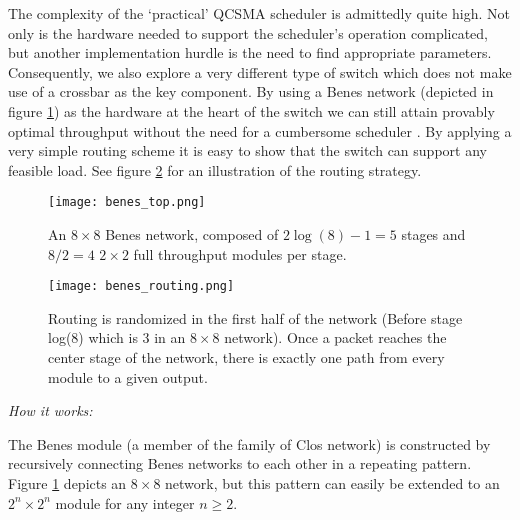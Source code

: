 \documentclass{IEEEtran}%
\begin{document}
The complexity of the `practical' QCSMA scheduler is admittedly quite high.  Not only is the hardware needed to support the scheduler's operation complicated, but another implementation hurdle is the need to find appropriate parameters.  Consequently, we also explore a very different type of switch which does not make use of a crossbar as the key component.  By using a Benes network (depicted in figure \ref{benes_top}) as the hardware at the heart of the switch we can still attain provably optimal throughput without the need for a cumbersome scheduler \cite{Walrand_Varaiya}.  By applying a very simple routing scheme it is easy to show that the switch can support any feasible load.  See figure \ref{benes_routing} for an illustration of the routing strategy.


\begin{figure}%
	 \texttt{[image: benes\_top.png]}
	\caption{An $8 \times 8$ Benes network, composed of $2\log(8)-1=5$ stages and $8/2=4$ $2\times 2$ full throughput modules per stage.} 	\label{benes_top}
\end{figure}


\begin{figure}%
	 \texttt{[image: benes\_routing.png]}
	\caption{Routing is randomized in the first half of the network (Before stage log(8) which is 3 in an $8\times8$ network).  Once a packet reaches the center stage of the network, there is exactly one path from every module to a given output.} 	\label{benes_routing}
\end{figure}

{\it How it works:}

The Benes module (a member of the family of Clos network) is constructed by recursively connecting Benes networks to each other in a repeating pattern.  Figure \ref{benes_top} depicts an $8\times8$ network, but this pattern can easily be extended to an $2^n \times 2^n$ module for any integer $n\geq2$.
\end{document}
